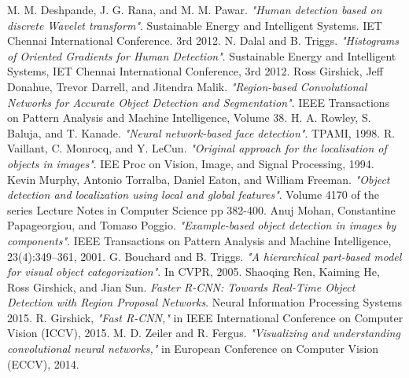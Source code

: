 \begin{thebibliography}{1}

M. M. Deshpande, J. G. Rana, and M. M. Pawar. \emph{"Human detection based on discrete Wavelet transform"}. Sustainable Energy and Intelligent Systems. IET Chennai International Conference. 3rd 2012.
N. Dalal and  B. Triggs. \emph{"Histograms of Oriented Gradients for Human Detection"}. Sustainable Energy and Intelligent Systems, IET Chennai International Conference, 3rd 2012.
Ross Girshick, Jeff Donahue, Trevor Darrell, and Jitendra Malik. \emph{"Region-based Convolutional Networks for Accurate Object Detection and Segmentation"}. IEEE Transactions on Pattern Analysis and Machine Intelligence, Volume 38.
H. A. Rowley, S. Baluja, and T. Kanade. \emph{"Neural network-based face detection"}. TPAMI, 1998.
R. Vaillant, C. Monrocq, and Y. LeCun. \emph{"Original approach for the localisation of objects in images"}. IEE Proc on Vision, Image, and
Signal Processing, 1994.
Kevin Murphy, Antonio Torralba, Daniel Eaton, and William Freeman. \emph{"Object detection and localization using local and global features"}. Volume 4170 of the series Lecture Notes in Computer Science pp 382-400.
Anuj Mohan, Constantine Papageorgiou, and Tomaso Poggio. \emph{"Example-based object detection in images by components"}. IEEE Transactions on Pattern Analysis and Machine Intelligence, 23(4):349–361, 2001.
G. Bouchard and B. Triggs. \emph{"A hierarchical part-based model for visual object categorization"}. In CVPR, 2005.
Shaoqing Ren, Kaiming He, Ross Girshick, and Jian Sun. \emph{Faster R-CNN: Towards Real-Time Object	Detection with Region Proposal Networks}. Neural Information Processing Systems 2015.
R. Girshick, \emph{"Fast R-CNN,"} in IEEE International Conference on Computer Vision (ICCV), 2015.
M. D. Zeiler and R. Fergus. \emph{"Visualizing and understanding convolutional neural networks,"} in European Conference on
Computer Vision (ECCV), 2014.
\end{thebibliography}